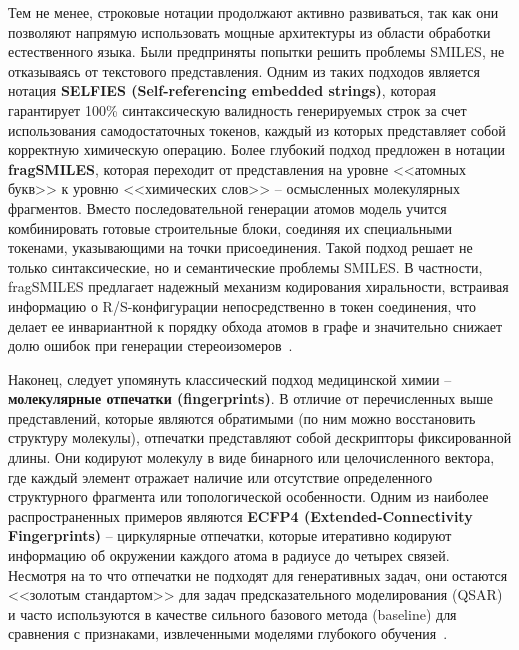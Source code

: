 Тем не менее, строковые нотации продолжают активно развиваться, так как они позволяют напрямую использовать мощные архитектуры из области обработки естественного языка. Были предприняты попытки решить проблемы SMILES, не отказываясь от текстового представления. Одним из таких подходов является нотация \textbf{SELFIES (Self-referencing embedded strings)}, которая гарантирует 100\% синтаксическую валидность генерируемых строк за счет использования самодостаточных токенов, каждый из которых представляет собой корректную химическую операцию. Более глубокий подход предложен в нотации \textbf{fragSMILES}, которая переходит от представления на уровне <<атомных букв>> к уровню <<химических слов>> -- осмысленных молекулярных фрагментов. Вместо последовательной генерации атомов модель учится комбинировать готовые строительные блоки, соединяя их специальными токенами, указывающими на точки присоединения. Такой подход решает не только синтаксические, но и семантические проблемы SMILES. В частности, fragSMILES предлагает надежный механизм кодирования хиральности, встраивая информацию о R/S-конфигурации непосредственно в токен соединения, что делает ее инвариантной к порядку обхода атомов в графе и значительно снижает долю ошибок при генерации стереоизомеров~\cite{mastrolorito2025fragsmiles}.

Наконец, следует упомянуть классический подход медицинской химии -- \textbf{молекулярные отпечатки (fingerprints)}. В отличие от перечисленных выше представлений, которые являются обратимыми (по ним можно восстановить структуру молекулы), отпечатки представляют собой дескрипторы фиксированной длины. Они кодируют молекулу в виде бинарного или целочисленного вектора, где каждый элемент отражает наличие или отсутствие определенного структурного фрагмента или топологической особенности. Одним из наиболее распространенных примеров являются \textbf{ECFP4 (Extended-Connectivity Fingerprints)} -- циркулярные отпечатки, которые итеративно кодируют информацию об окружении каждого атома в радиусе до четырех связей. Несмотря на то что отпечатки не подходят для генеративных задач, они остаются <<золотым стандартом>> для задач предсказательного моделирования (QSAR) и часто используются в качестве сильного базового метода (baseline) для сравнения с признаками, извлеченными моделями глубокого обучения~\cite{bjerrum2018improving}.
